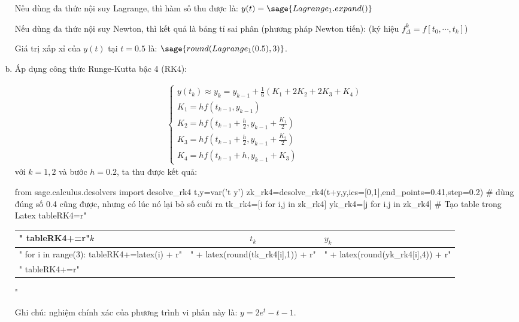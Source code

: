 \documentclass[12pt]{article}
\begin{document}
\begin{enumerate}[a).]
Nếu dùng đa thức nội suy Lagrange, thì hàm số thu được là: $y(t)=\sage{Lagrange_1.expand()}$

Nếu dùng đa thức nội suy Newton, thì kết quả là bảng tỉ sai phân (phương pháp Newton tiến): (ký hiệu $f_\Delta^k=f[t_0,\cdots,t_k]$)

  \begin{center}  \end{center} 

Giá trị xấp xỉ của $y(t)$ tại $t=0.5$ là: $\sage{round(Lagrange_1(0.5),3)}$.

\item Áp dụng công thức Runge-Kutta bậc 4 (RK4):

\begin{align*}
\left\lbrace \begin{array}{l}
               y(t_k) \approx y_k = y_{k-1} + \frac{1}{6}(K_1 + 2K_2 + 2K_3 + K_4) \\
               K_1 = h f(t_{k-1},y_{k-1}) \\
               K_2 = h f\left(t_{k-1}+\frac{h}{2},y_{k-1} + \frac{K_1}{2}\right) \\
               K_3 = h f\left(t_{k-1}+\frac{h}{2},y_{k-1} + \frac{K_2}{2}\right) \\
               K_4 = h f\left(t_{k-1}+h,y_{k-1} + K_3\right)
               \end{array}
\right.
\end{align*}
với $k=1, 2$ và bước $h=0.2$, ta thu được kết quả:
\begin{sagesilent}
 from sage.calculus.desolvers import desolve_rk4
 t,y=var('t y')
 zk_rk4=desolve_rk4(t+y,y,ics=[0,1],end_points=0.41,step=0.2) # dùng đúng số 0.4 cũng được, nhưng có lúc nó lại bỏ số cuối ra
 tk_rk4=[i for i,j in zk_rk4]
 yk_rk4=[j for i,j in zk_rk4]
 # Tạo table trong Latex
 tableRK4=r"\begin{tabular}{l|c|l}"
 tableRK4+=r"$k$ & $t_k$ & $y_k$ \\ \hline"
 for i in range(3):
   tableRK4+=latex(i) + r"&" + latex(round(tk_rk4[i],1)) + r"&" + latex(round(yk_rk4[i],4)) + r"\\"
 tableRK4+=r"\end{tabular}"
\end{sagesilent}

  \begin{center}  \end{center} 

  Ghi chú: nghiệm chính xác của phương trình vi phân này là: $y=2 e^t - t - 1$.

\end{enumerate}
\end{document}
